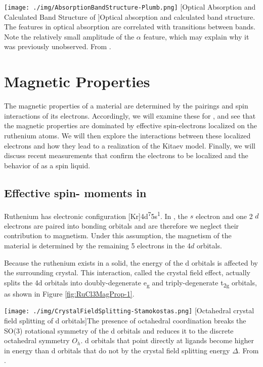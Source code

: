 \begin{centering}
\texttt{[image: ./img/AbsorptionBandStructure-Plumb.png]}
  \captionsetup{width=0.75\textwidth}
  [Optical Absorption and Calculated Band Structure of \ruclnospace]{Optical absorption and calculated band structure. The features in optical absorption are correlated with transitions between bands. Note the relatively small amplitude of the $\alpha$ feature, which may explain why it was previously unobserved. From \cite{Plumb2014}}. 
  \label{fig:RuCl3ElecStruct-6}
\end{centering}

\section{Magnetic Properties}

The magnetic properties of a material are determined by the pairings and spin interactions of its electrons. Accordingly, we will examine these for \rucl, and see that the magnetic properties are dominated by effective spin-\textonehalf electrons localized on the ruthenium atoms. We will then explore the interactions between these localized electrons and how they lead to a realization of the Kitaev model. Finally, we will discuss recent measurements that confirm the electrons to be localized and the behavior of \rucl as a spin liquid.

\subsection{Effective spin-\textonehalf{} moments in \texorpdfstring{\rucl}{RuCl3}}

Ruthenium has electronic configuration [Kr]4d\textsuperscript{7}5s\textsuperscript{1}. In \ruclnospace , the $s$ electron and one 2 $d$ electrons are paired into bonding orbitals and are therefore we neglect their contribution to magnetism. Under this assumption, the magnetism of the material is determined by the remaining 5 electrons in the 4$d$ orbitals.

Because the ruthenium exists in a solid, the energy of the d orbitals is affected by the surrounding crystal. This interaction, called the crystal field effect, actually splits the 4d orbitals into doubly-degenerate e\textsubscript{g} and triply-degenerate t\textsubscript{2g} orbitals, as shown in Figure \ref{fig:RuCl3MagProp-1}.

\begin{centering}
\texttt{[image: ./img/CrystalFieldSplitting-Stamokostas.png]}
  \captionsetup{width=0.75\textwidth}
  [Octahedral crystal field splitting of d orbitals]{The presence of octahedral coordination breaks the SO(3) rotational symmetry of the d orbitals and reduces it to the discrete octahedral symmetry $O_{h}$. d orbitals that point directly at ligands become higher in energy than d orbitals that do not by the crystal field splitting energy $\Delta$. From \cite{Stamokostas2018}.} 
  \label{fig:RuCl3MagProp-1}
\end{centering}

